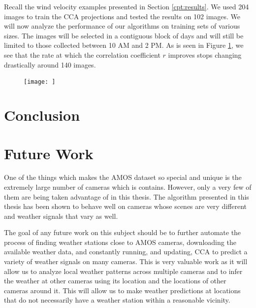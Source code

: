 
Recall the wind velocity examples presented in Section \ref{cpt:results}. We used 204 images to train the CCA projections and tested the results on 102 images. We will now analyze the performance of our algorithms on training sets of various sizes. The images will be selected in a contiguous block of days and will still be limited to those collected between 10 AM and 2 PM. As is seen in Figure \ref{fig:windcorrcompare}, we see that the rate at which the correlation coefficient $r$ improves stops changing drastically around 140 images.

\begin{figure}
	\centering
	\texttt{[image: ]}
	\caption{}
	\label{fig:windcorrcompare}
\end{figure}

\chapter{Conclusion}
\label{cpt:conclusion}


\chapter{Future Work}
\label{cpt:future}
One of the things which makes the AMOS dataset so special and unique is the extremely large number of cameras which is contains. However, only a very few of them are being taken advantage of in this thesis. The algorithm presented in this thesis has been shown to behave well on cameras whose scenes are very different and weather signals that vary as well.

The goal of any future work on this subject should be to further automate the process of finding weather stations close to AMOS cameras, downloading the available weather data, and constantly running, and updating, CCA to predict a variety of weather signals on many cameras. This is very valuable work as it will allow us to analyze local weather patterns across multiple cameras and to infer the weather at other cameras using its location and the locations of other cameras around it. This will allow us to make weather predictions at locations that do not necessarily have a weather station within a reasonable vicinity. 